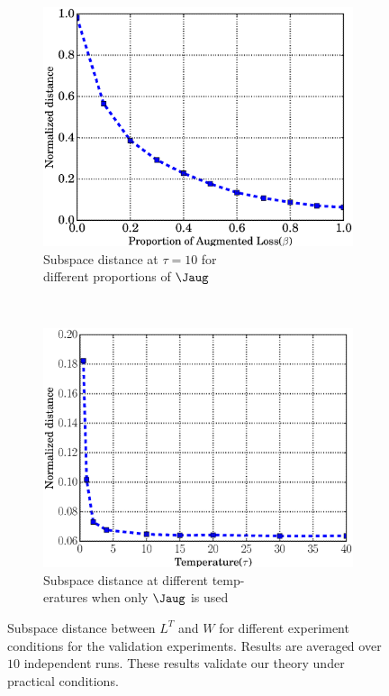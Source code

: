 \begin{figure}[t!]
    \centering
    \begin{subfigure}[t]{0.5\textwidth}
        \centering
        \includegraphics[scale=0.32]{Prop.eps}
        \caption{Subspace distance at $\tau=10$ for \\ different proportions of $\Jaug$}
    \end{subfigure}%
    ~ 
    \begin{subfigure}[t]{0.5\textwidth}
        \centering
        \includegraphics[scale=0.32]{Temp.eps}
        \caption{Subspace distance at different temp-\\eratures  when only $\Jaug$ is used}
    \end{subfigure}
    \caption{Subspace distance between $L^T$ and $W$ for different experiment conditions for the validation experiments. Results are averaged over $10$ independent runs. These results validate our theory under practical conditions.}
    \label{fig:normdist}
\end{figure}

